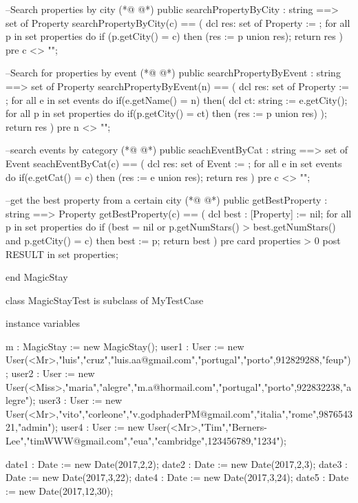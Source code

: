 \begin{vdmpp}[breaklines=true]
   
 --Search properties by city
(*@
\label{searchPropertyByCity:66}
@*)
 public searchPropertyByCity : string ==> set of Property
  searchPropertyByCity(c) ==
  (
   dcl res: set of Property := {};
    for all p in set properties do 
     if (p.getCity() = c)
      then (res := {p} union res);
   return res
  )
  pre c <> "";
  
 --Search for properties by event
(*@
\label{searchPropertyByEvent:78}
@*)
 public searchPropertyByEvent : string ==> set of Property
  searchPropertyByEvent(n) ==
  (
   dcl res: set of Property := {};
    for all e in set events do
     if(e.getName() = n)
      then(
         dcl ct: string := e.getCity();
          for all p in set properties do
           if(p.getCity() = ct)
            then (res := {p} union res)
        );
   return res
  )
  pre n <> "";
  
 --search events by category
(*@
\label{seachEventByCat:95}
@*)
 public seachEventByCat : string ==> set of Event
  seachEventByCat(c) == 
  (
   dcl res: set of Event := {};
    for all e in set events do
     if(e.getCat() = c)
      then (res := {e} union res);
   return res
  )
  pre c <> "";
  
 --get the best property from a certain city
(*@
\label{getBestProperty:107}
@*)
 public getBestProperty : string ==> Property
  getBestProperty(c) ==
  (
   dcl best : [Property] := nil;
   for all p in set properties do
    if (best = nil or p.getNumStars() > best.getNumStars() and p.getCity() = c) then
     best := p;
   return best
  )
  pre card properties > 0
  post RESULT in set properties;
 
end MagicStay

class MagicStayTest is subclass of MyTestCase

instance variables

 m : MagicStay := new MagicStay();
 user1 : User := new User(<Mr>,"luis","cruz","luis.aa@gmail.com","portugal","porto",912829288,"feup");
 user2 : User := new User(<Miss>,"maria","alegre","m.a@hormail.com","portugal","porto",922832238,"alegre");
 user3 : User := new User(<Mr>,"vito","corleone","v.godphaderPM@gmail.com","italia","rome",987654321,"admin");
 user4 : User := new User(<Mr>,"Tim","Berners-Lee","timWWW@gmail.com","eua","cambridge",123456789,"1234");
 
 date1 : Date := new Date(2017,2,2);
 date2 : Date := new Date(2017,2,3);
 date3 : Date := new Date(2017,3,22);
 date4 : Date := new Date(2017,3,24);
 date5 : Date := new Date(2017,12,30);
 

\end{vdmpp}
